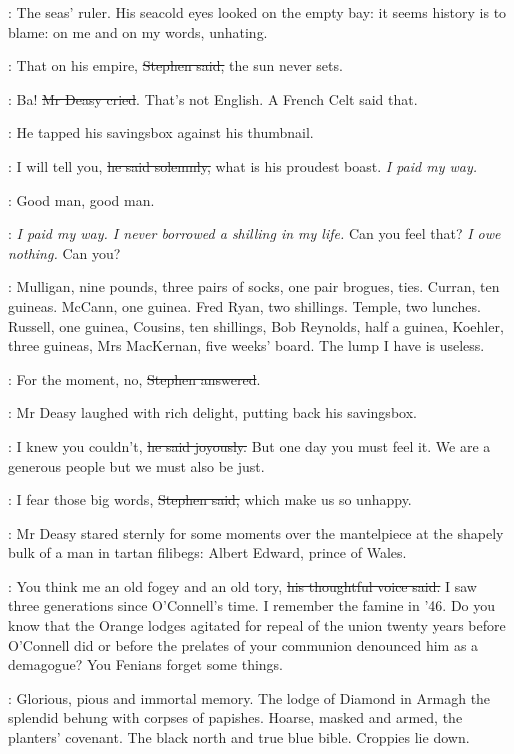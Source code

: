 \StephenInt:
The seas' ruler.
His seacold eyes looked on the empty bay:
it seems history is to blame:
on me and on my words, unhating.

\Stephen:
That on his empire, \sout{Stephen said,} the sun never sets.

\deasy:
Ba! \sout{Mr Deasy cried}.
That's not English.
A French Celt said that.

:
He tapped his savingsbox against his thumbnail.

\deasy:
I will tell you, \sout{he said solemnly,} what is his proudest boast.
\emph{I paid my way.}

\StephenInt:
Good man, good man.

\deasy:
\emph{I paid my way.
I never borrowed a shilling in my life.}
Can you feel that?
\emph{I owe nothing.}
Can you?

\StephenInt:
Mulligan, nine pounds, three pairs of socks, one pair brogues, ties.
Curran, ten guineas.
McCann, one guinea.
Fred Ryan, two shillings.
Temple, two lunches.
Russell, one guinea,
Cousins, ten shillings,
Bob Reynolds, half a guinea,
Koehler, three guineas,
Mrs MacKernan, five weeks' board.
The lump I have is useless.

\Stephen:
For the moment, no,
\sout{Stephen answered}.

:
Mr Deasy laughed with rich delight, putting back his savingsbox.

\deasy:
I knew you couldn't, \sout{he said joyously.}
But one day you must feel it.
We are a generous people but we must also be just.

\Stephen:
I fear those big words, \sout{Stephen said,}
which make us so unhappy.

:
Mr Deasy stared sternly for some moments over the mantelpiece
at the shapely bulk of a man in tartan filibegs:
Albert Edward, prince of Wales.

\deasy:
You think me an old fogey and an old tory, \sout{his thoughtful voice said.}
I saw three generations since O'Connell's time.
I remember the famine in '46.
Do you know that the Orange lodges agitated for repeal of the union
twenty years before O'Connell did
or before the prelates of your communion denounced him as a demagogue?
You Fenians forget some things.

\StephenInt:
Glorious, pious and immortal memory.
The lodge of Diamond in Armagh
the splendid behung with corpses of papishes.
Hoarse, masked and armed, the planters' covenant.
The black north and true blue bible.
Croppies lie down.

